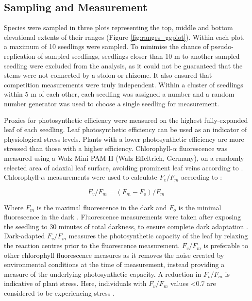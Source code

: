 \documentclass[a4paper, 11pt]{article}
\begin{document}
\subsection{Sampling and Measurement}
Species were sampled in three plots representing the top, middle and bottom elevational extents of their ranges (Figure \ref{fig:ranges_ggplot}). Within each plot, a maximum of 10 seedlings were sampled. To minimise the chance of pseudo-replication of sampled seedlings, seedlings closer than 10 m to another sampled seedling were excluded from the analysis, as it could not be guaranteed that the stems were not connected by a stolon or rhizome. It also ensured that competition measurements were truly independent. Within a cluster of seedlings within 5 m of each other, each seedling was assigned a number and a random number generator was used to choose a single seedling for measurement.

Proxies for photosynthetic efficiency were measured on the highest fully-expanded leaf of each seedling. Leaf photosynthetic efficiency can be used as an indicator of physiological stress levels. Plants with a lower photosynthetic efficiency are more stressed than those with a higher efficiency. Chlorophyll-$\alpha$ fluorescence was measured using a Walz Mini-PAM II (Walz Effeltrich, Germany), on a randomly selected area of adaxial leaf surface, avoiding prominent leaf veins according to \citep{}. Chlorophyll-$\alpha$ measurements were used to calculate $F_v/F_m$ according to \citet{Genty1989}:

\begin{equation} \label{eq:fvfm}
F_v/F_m = (F_m - F_o)/F_m
\end{equation}

Where $F_m$ is the maximal fluorescence in the dark and $F_o$ is the minimal fluorescence in the dark \citep{Maxwell2000}. Fluorescence measurements were taken after exposing the seedling to 30 minutes of total darkness, to ensure complete dark adaptation \citep{Campbell2007}. Dark-adapted $F_v/F_m$ measures the photosynthetic capacity of the leaf by relaxing the reaction centres prior to the fluorescence measurement. $F_v/F_m$ is preferable to other chlorophyll fluorescence measures as it removes the noise created by environmental conditions at the time of measurement, instead providing a measure of the underlying photosynthetic capacity. A reduction in $F_v/F_m$ is indicative of plant stress. Here, individuals with $F_v/F_m$ values \textless{}0.7 are considered to be experiencing stress \citep{Maxwell2000}. 
\end{document}
